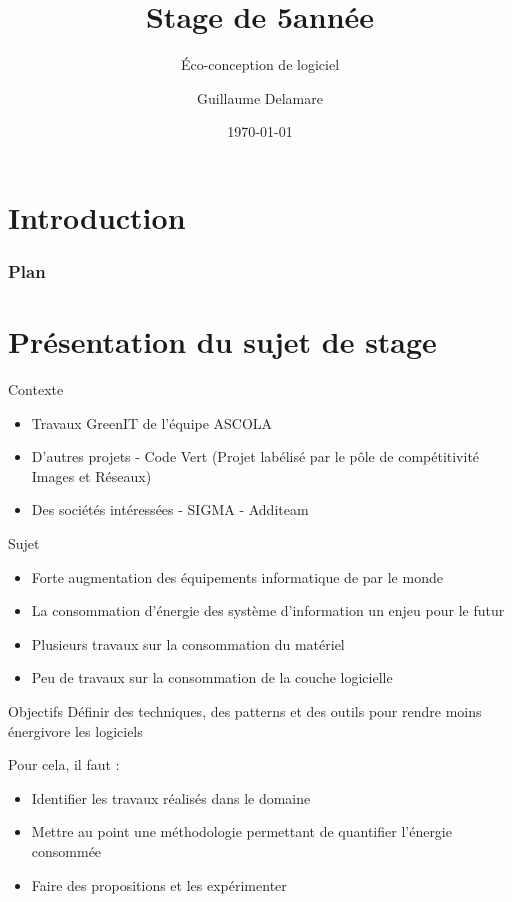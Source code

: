 \documentclass{beamer}
\title{Stage de 5\ieme année}
\subtitle{Éco-conception de logiciel}
\author{Guillaume Delamare}
\institute{EMN - Équipe ASCOLA}
\date{\today}
\begin{document}
    \begin{frame}
	\titlepage
    \end{frame}

    \section*{Introduction}
	\begin{frame}
	    \frametitle{Plan}
	    \tableofcontents[hideallsubsections]{}
	\end{frame}
	
    \section{Présentation du sujet de stage}
	\begin{frame}{Contexte}
	    \begin{itemize}
		\item Travaux GreenIT de l'équipe ASCOLA
		\item D'autres projets - Code Vert (Projet labélisé par le pôle de compétitivité Images et Réseaux)
		\item Des sociétés intéressées - SIGMA - Additeam
	    \end{itemize}
	\end{frame}
    	\begin{frame}{Sujet}
	    \begin{itemize}
		\item Forte augmentation des équipements informatique de par le monde
		\item La consommation d'énergie des système d'information un enjeu pour le futur
		\item Plusieurs travaux sur la consommation du matériel
		\item Peu de travaux sur la consommation de la couche logicielle
	    \end{itemize}
	\end{frame}
	\begin{frame}{Objectifs}
	    Définir des techniques, des patterns et des outils pour rendre moins énergivore les logiciels
	    \begin{block}{Pour cela, il faut :}
	    \begin{itemize}
		\item Identifier les travaux réalisés dans le domaine
		\item Mettre au point une méthodologie permettant de quantifier l'énergie consommée
		\item Faire des propositions et les expérimenter
	    \end{itemize}
	    \end{block}
	\end{frame}
		
\end{document}
